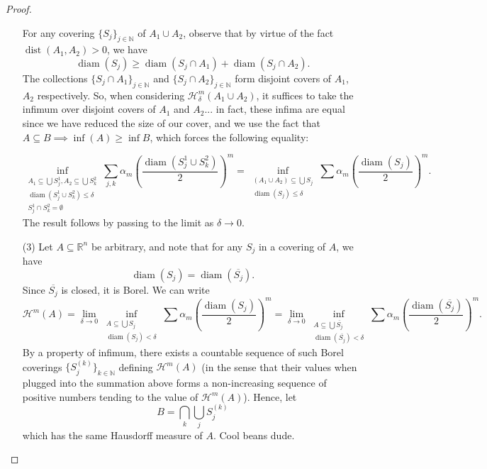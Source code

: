 \documentclass[10pt]{article}
\theoremstyle{plain}
\DeclareMathOperator{\diam}{diam}
\DeclareMathOperator{\dist}{dist}
\begin{document}
\begin{proof}
\begin{itemize}
			For any covering $\{S_j\}_{j \in \mathbb{N}}$ of $A_1 \cup A_2$, observe that by virtue of the fact $\dist(A_1, A_2) > 0$, we have $$\diam(S_j) \geq \diam(S_j \cap A_1) + \diam(S_j \cap A_2).$$ The collections $\{S_j \cap A_1\}_{j \in \mathbb{N}}$ and $\{S_j \cap A_2\}_{j \in \mathbb{N}}$ form disjoint covers of $A_1$, $A_2$ respectively. So, when considering $\mathcal{H}_\delta^m(A_1 \cup A_2)$, it suffices to take the infimum over disjoint covers of $A_1$ and $A_2$... in fact, these infima are equal since we have reduced the size of our cover, and we use the fact that $ A \subseteq B \implies \inf(A) \geq \inf B$, which forces the following equality: 
			
			$$\inf_{\substack{A_1 \subseteq \bigcup S_j^1, A_2 \subseteq \bigcup S_k^2 \\ \boxed{\diam(S_j^1 \cup S_k^2) \leq \delta }  \\ S_j^1 \cap S_k^2 = \emptyset}} \sum_{j, k} \alpha_m  \left(\frac{\diam(S_j^1 \cup S_k^2)}{2}\right)^m = \inf_{\substack{(A_1 \cup A_2) \subseteq \bigcup S_j \\ \diam(S_j) \leq \delta}} \sum \alpha_m \left(\frac{\diam(S_j)}{2}\right)^m.$$ The result follows by passing to the limit as $\delta \to 0$. 
			
			\item[(3)]  Let $A \subseteq \mathbb{R}^n$ be arbitrary, and note that for any $S_j$ in a covering of $A$, we have $$\diam(S_j) = \diam(\overline{S_j}).$$ Since $\overline{S_j}$ is closed, it is Borel. We can write $$\mathcal{H}^m(A) = \lim_{\delta \to 0} \inf_{\substack{A \subseteq \bigcup S_j \\ \diam(S_j) < \delta}} \sum \alpha_m \left(\frac{\diam(S_j)}{2}\right)^m = \lim_{\delta \to 0} \inf_{\substack{A \subseteq \bigcup \overline{S_j} \\ \diam(\overline{S_j}) < \delta}} \sum \alpha_m \left(\frac{\diam(\overline{S_j})}{2}\right)^m.$$ 
			By a property of infimum, there exists a countable sequence of such Borel coverings $\{S_j^{(k)}\}_{k \in \mathbb{N}}$ defining $\mathcal{H}^m(A)$ (in the sense that their values when plugged into the summation above forms a non-increasing sequence of positive numbers tending to the value of $\mathcal{H}^m(A)$). Hence, let $$B = \bigcap_k \bigcup_j S_j^{(k)}$$ which has the same Hausdorff measure of $A$. Cool beans dude. 
		\end{itemize}
	\end{proof}
\end{document}
